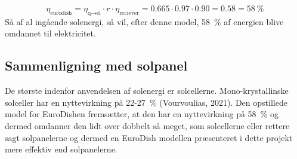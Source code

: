 \documentclass[SRC.tex]{subfiles}
\begin{document}
	\begin{equation}
		\eta_{\text{eurodish}} = \eta_{\text{q}\rightarrow\text{el}} \cdot r \cdot \eta_{\text{reciever}}  = 0.665 \cdot 0.97 \cdot 0.90 = 0.58 = \SI{58}{\percent}
		\label{eq:nyt}
	\end{equation} 
	Så af al ingående solenergi, så vil, efter denne model, \SI{58}{\percent} af energien blive omdannet til elektricitet. 
	\subsection{Sammenligning med solpanel}
	De største indenfor anvendelsen af solenergi er solcellerne. Mono-krystallinske solceller har en nyttevirkning på 22-\SI{27}{\percent} (Vourvoulias, 2021).
	Den opstillede model for EuroDishen fremsætter, at den har en nyttevirkning på \SI{58}{\percent} 
	og dermed omdanner den lidt over dobbelt så meget, som solcellerne eller rettere sagt solpanelerne og dermed en EuroDish modellen præsenteret i dette projekt mere effektiv end solpanelerne. 
\end{document}
